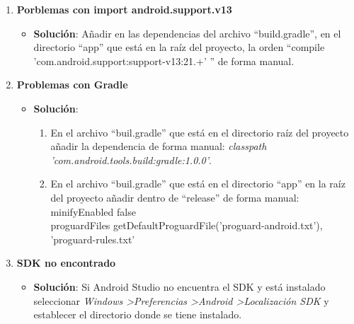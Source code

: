 \begin{enumerate}
\begin{itemize}
				
			\end{itemize}
			
		\newpage
		\item {\bf Porblemas con import android.support.v13}
			\begin{itemize}
				\item {\bf Solución}: Añadir en las dependencias del archivo ``build.gradle'', en el directorio ``app'' que está en la raíz del proyecto, la orden ``compile 'com.android.support:support-v13:21.+' '' de forma manual.
				
				\noindent
				
			\end{itemize}
			
		\newpage
		\item {\bf Problemas con Gradle}
			\begin{itemize}
				\item {\bf Solución}:
					\begin{enumerate}
						\item En el archivo ``buil.gradle'' que está en el directorio raíz del proyecto añadir la dependencia de forma manual: {\it classpath 'com.android.tools.build:gradle:1.0.0'}.
						\item En el archivo ``buil.gradle'' que está en el directorio ``app'' en la raíz del proyecto añadir dentro de ``release'' de forma manual:
							minifyEnabled false\\
							proguardFiles getDefaultProguardFile('proguard-android.txt'), 'proguard-rules.txt'
					\end{enumerate}
					\noindent
					
					
			\end{itemize}
		
		\newpage
		\item {\bf SDK no encontrado}
			\begin{itemize}
				\item {\bf Solución}: Si Android Studio no encuentra el SDK y está instalado seleccionar {\it Windows \textgreater Preferencias \textgreater Android \textgreater Localización SDK} y establecer el directorio donde se tiene instalado.
			\end{itemize}
			

\end{enumerate}

